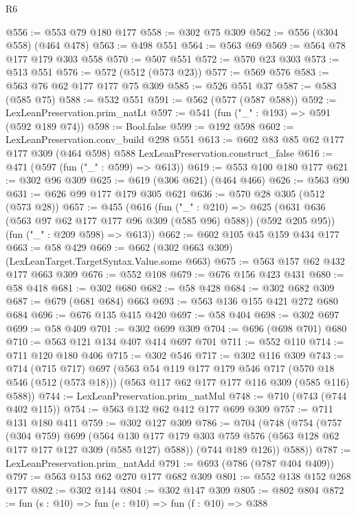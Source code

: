 \begin{lexlean}{R6}
\begin{coremodule}
@556 := @553 @79 @180 @177
@558 := @302 @75 @309
@562 := @556 (@304 @558) (@464 @478)
@563 := @498 @551
@564 := @563 @69
@569 := @564 @78 @177 @179 @303 @558
@570 := @507 @551
@572 := @570 @23 @303
@573 := @513 @551
@576 := @572 (@512 (@573 @23))
@577 := @569 @576
@583 := @563 @76 @62 @177 @177 @75 @309
@585 := @526 @551 @37
@587 := @583 (@585 @75)
@588 := @532 @551
@591 := @562 (@577 (@587 @588))
@592 := LexLeanPreservation.prim_natLt
@597 := @541 (fun ("_" : @193) => @591 (@592 @189 @74))
@598 := Bool.false
@599 := @192 @598
@602 := LexLeanPreservation.conv_build @298 @551
@613 := @602 @83 @85 @62 @177 @177 @309 (@464 @598) @588 LexLeanPreservation.construct_false
@616 := @471 (@597 (fun ("_" : @599) => @613))
@619 := @553 @100 @180 @177
@621 := @302 @96 @309
@625 := @619 (@306 @621) (@464 @466)
@626 := @563 @90
@631 := @626 @99 @177 @179 @305 @621
@636 := @570 @28 @305 (@512 (@573 @28))
@657 := @455
    (@616
      (fun ("_" : @210) =>
      @625 (@631 @636 (@563 @97 @62 @177 @177 @96 @309 (@585 @96) @588)) (@592 @205 @95))
      (fun ("_" : @209 @598) => @613))
@662 := @602 @105 @45 @159 @434 @177
@663 := @58 @429
@669 := @662 (@302 @663 @309) (LexLeanTarget.TargetSyntax.Value.some @663)
@675 := @563 @157 @62 @432 @177 @663 @309
@676 := @552 @108
@679 := @676 @156 @423 @431
@680 := @58 @418
@681 := @302 @680
@682 := @58 @428
@684 := @302 @682 @309
@687 := @679 (@681 @684) @663
@693 := @563 @136 @155 @421 @272 @680 @684
@696 := @676 @135 @415 @420
@697 := @58 @404
@698 := @302 @697
@699 := @58 @409
@701 := @302 @699 @309
@704 := @696 (@698 @701) @680
@710 := @563 @121 @134 @407 @414 @697 @701
@711 := @552 @110
@714 := @711 @120 @180 @406
@715 := @302 @546
@717 := @302 @116 @309
@743 := @714
    (@715 @717)
    @697
    (@563
      @54
      @119
      @177
      @179
      @546
      @717
      (@570 @18 @546 (@512 (@573 @18)))
      (@563 @117 @62 @177 @177 @116 @309 (@585 @116) @588))
@744 := LexLeanPreservation.prim_natMul
@748 := @710 (@743 (@744 @402 @115))
@754 := @563 @132 @62 @412 @177 @699 @309
@757 := @711 @131 @180 @411
@759 := @302 @127 @309
@786 := @704
    (@748
      (@754
        (@757
          (@304 @759)
          @699
          (@564 @130 @177 @179 @303 @759 @576 (@563 @128 @62 @177 @177 @127 @309 (@585 @127) @588))
          (@744 @189 @126))
        @588))
@787 := LexLeanPreservation.prim_natAdd
@791 := @693 (@786 (@787 @404 @409))
@797 := @563 @153 @62 @270 @177 @682 @309
@801 := @552 @138 @152 @268 @177
@802 := @302 @144
@804 := @302 @147 @309
@805 := @802 @804
@872 := fun (s : @10) =>
  fun (e : @10) =>
  fun (f : @10) =>
  @388

\end{coremodule}
\end{lexlean}
